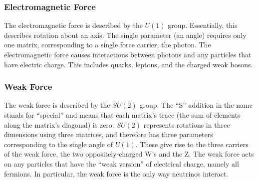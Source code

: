 \subsubsection{Electromagnetic Force}
\label{theory:EM}
The electromagnetic force is described by the $U(1)$ group.  
Essentially, this describes rotation about an axis.  %
The single parameter (an angle) requires only one matrix, 
corresponding to a single %
force carrier, the photon.  
The electromagnetic force causes interactions between 
photons and any particles that have electric charge.  
This includes quarks, leptons, and the charged weak bosons.  

\subsubsection{Weak Force}
\label{theory:weak}
The weak force is 
described %
by the $SU(2)$ group.  
The ``S'' addition in the name stands for ``special'' 
and means that each matrix's trace 
(the sum of elements along the matrix's diagonal) is zero.  
$SU(2)$ represents rotations in three dimensions 
using three matrices, 
and therefore has three parameters corresponding 
to the single angle of $U(1)$.  
These give rise to the three carriers of the weak force, 
the two oppositely-charged W's and the Z.  %
The weak force acts on any particles that have the ``weak 
version'' of electrical charge, %
namely all fermions.  
In particular, the weak force is the only way 
neutrinos interact.  

